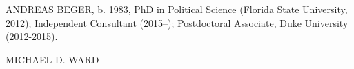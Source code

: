 \documentclass[pdftex,11pt]{article}
\begin{document}
%
%
%

ANDREAS BEGER, b. 1983, PhD in Political Science (Florida State University, 2012); Independent Consultant (2015--); Postdoctoral Associate, Duke University (2012-2015).

MICHAEL D. WARD


%
%
\end{document}
